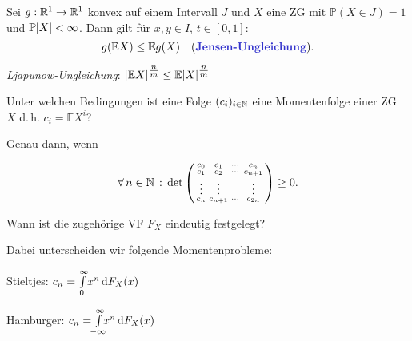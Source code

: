 \documentclass{cheat-sheet}
\renewcommand{\P}{\mathbb{P}} %
\newcommand{\E}{\mathbb{E}} %
\begin{document}
\begin{satz}
  Sei $g : \mathbb{R}^1 \to \mathbb{R}^1$ konvex auf einem Intervall $J$ und $X$ eine ZG mit $\P(X \in J) = 1$ und $\P \abs{X} < \infty$. Dann gilt für $x, y \in I$, $t \in \left[0,1\right]$:
  \[
    g(\E X) \leq \E g(X)
    \quad \text{(\emph{Jensen-Ungleichung}).}
  \]
\end{satz}

\iffalse
  Per Induktion folgt: $g(\sum_{i=1}^n \alpha_i x_i) \leq \sum_{i=1}^n \alpha_i g(x_i)$ für $x_1, ..., x_n \in J$, $\alpha_i \geq 0$, $\alpha_1 + ... + \alpha_n = 1$
\fi

\begin{kor}
  \emph{Ljapunow-Ungleichung}: $\abs{\E X}^{\tfrac{n}{m}} \leq \E \abs{X}^{\tfrac{n}{m}}$
\end{kor}

\begin{frage}[Momentenproblem (MP)]
  Unter welchen Bedingungen ist eine Folge $(c_i)_{i \in \mathbb{N}}$ eine Momentenfolge einer ZG $X$ d.\,h. $c_i = \E X^i$?
\end{frage}

\begin{antwort}

  Genau dann, wenn

  \[
    \forall \, {n \in \mathbb{N}} \,:\, \det \left( \begin{smallmatrix} c_0 & c_1 & \cdots & c_n \\ c_1 & c_2 & \cdots & c_{n+1} \\ \vdots & \vdots & & \vdots \\ c_n & c_{n+1} & \cdots & c_{2n} \end{smallmatrix} \right) \geq 0.
  \]
\end{antwort}

\begin{frage}
  Wann ist die zugehörige VF $F_X$ eindeutig festgelegt?
\end{frage}

\begin{bem}
  Dabei unterscheiden wir folgende Momentenprobleme:
  \begin{itemize}
    \begin{multicols}{2}
      \item Stieltjes: $c_n = {\textstyle \int\limits_{0}^{\infty}} x^n \,\mathrm{d} F_X(x)$
      \item Hamburger: $c_n = \Int{\mathclap{-\infty}}{\infty}{x^n}{F_X(x)}$
    \end{multicols}
  \end{itemize}
\end{bem}
\end{document}

